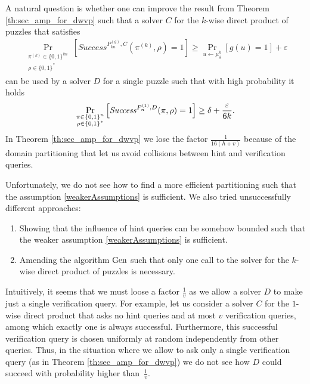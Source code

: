 A natural question is whether one can improve the result from Theorem \ref{th:sec_amp_for_dwvp}
such that a solver $C$ for the $k$-wise direct product of puzzles that satisfies
\begin{align}
    \label{weakerAssumptions}
    \underset{\substack{\pi^{(k)} \in \{0,1\}^{kn} \\ \rho \in \{0,1\}^{*}}}{\Pr}\left[\mathit{Success}^{P_{kn}^{(g)}, C}(\pi^{(k)}, \rho) = 1\right]
    \geq \underset{u \leftarrow \mu_\delta^k}{\Pr}[g(u) = 1] + \varepsilon
\end{align}
can be used by a solver $D$ for a single puzzle such that with high probability it holds
  \begin{align}
    \underset{\substack{\pi \in \{0,1\}^{n} \\ \rho \in \{0,1\}^{*}}}
    {\Pr}\left[\operatorname{\mathit{Success}}^{P_{n}^{(1)},D}(\pi, \rho) = 1\right] \geq \delta + \frac{\varepsilon}{6k}.
  \end{align}
In Theorem \ref{th:sec_amp_for_dwvp} we lose the factor $\frac{1}{16(h+v)}$ because of the domain partitioning that let us avoid collisions between hint and verification queries.

Unfortunately, we do not see how to find a more efficient partitioning such that the assumption \eqref{weakerAssumptions} is sufficient.
We also tried unsuccessfully different approaches:
\begin{enumerate}[-]
  \item Showing that the influence of hint queries can be somehow bounded such that the weaker assumption \eqref{weakerAssumptions} is sufficient.
  \item Amending the algorithm $\operatorname{\text{Gen}}$ such that only one call to the solver for the $k$-wise direct product of puzzles is necessary.
\end{enumerate}

Intuitively, it seems that we must loose a factor $\frac{1}{v}$ as we allow a solver $D$ to make just a single verification query.
For example, let us consider a solver $C$ for the $1$-wise direct product that asks no hint queries and at most $v$ verification queries,
among which exactly one is always successful.
Furthermore, this successful verification query is chosen uniformly at random independently from other queries.
Thus, in the situation where we allow to ask only a single verification query (as in Theorem \ref{th:sec_amp_for_dwvp})
we do not see how $D$ could succeed with probability higher than~$\frac{1}{v}$.

